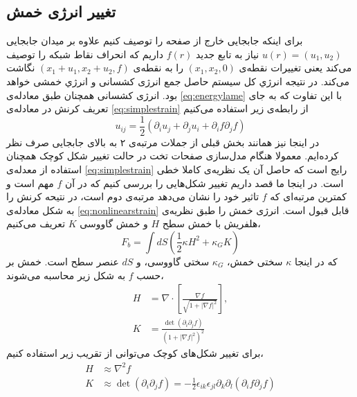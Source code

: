 \setRL



\subsection{
تغییر انرژی خمش
}
برای اینکه جابجایی خارج از صفحه را توصیف کنیم علاوه بر میدان جابجایی 
$u(r)=(u_1,u_2)$
نیاز به تابع جدید 
$f(r)$
داریم که انحراف
 نقاط شبکه را توصیف می‌کند یعنی تغییرات نقطه‌ی 
$(x_1,x_2,0)$
را به نقطه‌ی 
$(x_1+u_1,x_2+u_2,f)$
نگاشت می‌کند. در نتیجه انرژي کل سیستم حاصل جمع انرژی کشسانی و انرژي خمشی خواهد بود. انرژی کشسانی همچنان طبق معادله‌ی
\ref{eq:energylame}
با این تفاوت که به جای تعریف کرنش در معادله‌ی 
\ref{eq:simplestrain}
از رابطه‌ی زیر استفاده می‌کنیم
\begin{equation}
u_{ij}=\frac{1}{2}(\partial_iu_j+\partial_ju_i+\partial_if\partial_jf)
\label{eq:nonlinearstrain}
\end{equation}
در اینجا نیز همانند بخش قبلی از جملات مرتبه‌ی ۲ به بالای جابجایی صرف نظر کرده‌ایم. معمولا هنگام  مدل‌سازی صفحات تخت در حالت تغییر شکل کوچک همچنان استفاده از معدله‌ی 
\ref{eq:simplestrain}
رایج است که حاصل آن یک نظریه‌ی کاملا خطی است. در اینجا ما قصد داریم تغییر شکل‌هایی را بررسی کنیم که در آن $f$ مهم است و کمترین مرتبه‌ای که $f$ 
تاثیر خود را نشان می‌دهد مرتبه‌ی دوم است، در نتیحه کرنش را به شکل  معادله‌ی 
\ref{eq:nonlinearstrain}
قابل قبول است. انرژی خمش را طبق نظریه‌ی هلفریش
\cite{Helfrich1973}
با خمش سطح $H$
و خمش گاووسی $K$
تعریف می‌کنیم، 
\begin{equation}
F_b=\int dS\left(\frac{1}{2}\kappa H^2+\kappa_GK\right)
\end{equation}
که در اینجا 
$\kappa$
سختی خمش، 
$\kappa_G$
سختی گاووسی، و 
$dS$
عنصر سطح است. خمش بر حسب 
$f$
 به شکل زیر محاسبه می‌شوند،
\begin{equation}
\begin{aligned}
H&=\nabla\cdot\left[\frac{\nabla f}{\sqrt{1+|\nabla f|^2}}\right],\\
K&=\frac{\det(\partial_i\partial_jf)}{\left(1+|\nabla f|^2\right)^2}
\end{aligned}
\end{equation}
برای تغییر شکل‌های کوچک می‌توانی از تقریب زیر استفاده کنیم،
\begin{equation}
\begin{aligned}
H&\approx\nabla^2f\\
K&\approx \det(\partial_i\partial_jf)=-\frac{1}{2}\epsilon_{ik}\epsilon_{jl}\partial_k\partial_l(\partial_if\partial_jf)
\end{aligned}
\end{equation}
